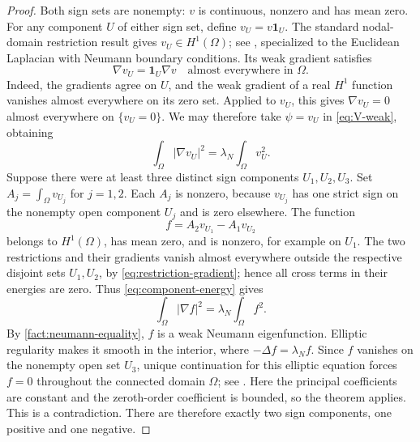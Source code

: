 \begin{proof}
Both sign sets are nonempty: $v$ is continuous, nonzero and has mean
zero. For any component $U$ of either sign set, define
$v_U=v\mathbf1_U$. The standard nodal-domain restriction result gives
$v_U\in H^1(\Omega)$; see \cite[Lemma 3.6, equation (3.1)]{Kluitenberg},
specialized to the Euclidean Laplacian with Neumann boundary conditions.
Its weak gradient satisfies
\begin{equation}\label{eq:restriction-gradient}
 \nabla v_U=\mathbf1_U\nabla v\quad\text{almost everywhere in }\Omega.
\end{equation}
Indeed, the gradients agree on $U$, and the weak gradient of a real
$H^1$ function vanishes almost everywhere on its zero set. Applied to
$v_U$, this gives $\nabla v_U=0$ almost everywhere on $\{v_U=0\}$.
We may therefore take $\psi=v_U$ in \cref{eq:V-weak}, obtaining
\begin{equation}\label{eq:component-energy}
 \int_\Omega|\nabla v_U|^2
 =\lambda_N\int_\Omega v_U^2.
\end{equation}
Suppose there were at least three distinct sign components
$U_1,U_2,U_3$. Set $A_j=\int_\Omega v_{U_j}$ for $j=1,2$.
Each $A_j$ is nonzero, because $v_{U_j}$ has one strict sign on the
nonempty open component $U_j$ and is zero elsewhere. The function
\[
 f=A_2v_{U_1}-A_1v_{U_2}
\]
belongs to $H^1(\Omega)$, has mean zero, and is nonzero, for example
on $U_1$. The two restrictions and their gradients vanish almost
everywhere outside the respective disjoint sets $U_1,U_2$, by
\cref{eq:restriction-gradient}; hence all cross terms in their energies
are zero.
Thus \cref{eq:component-energy} gives
\[
 \int_\Omega|\nabla f|^2=\lambda_N\int_\Omega f^2.
\]
By \cref{fact:neumann-equality}, $f$ is a weak Neumann eigenfunction.
Elliptic regularity makes it smooth in the interior, where
$-\Delta f=\lambda_N f$. Since $f$ vanishes on the nonempty open set
$U_3$, unique continuation for this elliptic equation forces $f=0$
throughout the connected domain $\Omega$; see
\cite[Theorem, pp.~235--236]{Aronszajn}. Here the principal coefficients
are constant and the zeroth-order coefficient is bounded, so the
theorem applies. This is a contradiction. There are therefore
exactly two sign components, one positive and one negative.


\end{proof}
